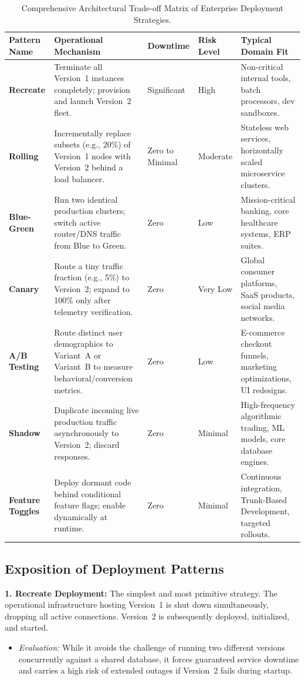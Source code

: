 \documentclass[11pt,a4paper]{article}
\begin{document}
\begin{table}[htbp]
\centering
\scriptsize
\renewcommand{\arraystretch}{1.3}
\begin{tabularx}{\textwidth}{L{2.0cm} Y L{1.5cm} L{1.5cm} L{2.8cm}}
\toprule
{}
\textbf{Pattern Name} & \textbf{Operational Mechanism} & \textbf{Downtime} & \textbf{Risk Level} & \textbf{Typical Domain Fit} \\
\midrule
\textbf{Recreate} & Terminate all Version~1 instances completely; provision and launch Version~2 fleet. & Significant & High & Non-critical internal tools, batch processors, dev sandboxes. \\
\textbf{Rolling} & Incrementally replace subsets (e.g., 20\%) of Version~1 nodes with Version~2 behind a load balancer. & Zero to Minimal & Moderate & Stateless web services, horizontally scaled microservice clusters. \\
\textbf{Blue-Green} & Run two identical production clusters; switch active router/DNS traffic from Blue to Green. & Zero & Low & Mission-critical banking, core healthcare systems, ERP suites. \\
\textbf{Canary} & Route a tiny traffic fraction (e.g., 5\%) to Version~2; expand to 100\% only after telemetry verification. & Zero & Very Low & Global consumer platforms, SaaS products, social media networks. \\
\textbf{A/B Testing} & Route distinct user demographics to Variant~A or Variant~B to measure behavioral/conversion metrics. & Zero & Low & E-commerce checkout funnels, marketing optimizations, UI redesigns. \\
\textbf{Shadow} & Duplicate incoming live production traffic asynchronously to Version~2; discard responses. & Zero & Minimal & High-frequency algorithmic trading, ML models, core database engines. \\
\textbf{Feature Toggles} & Deploy dormant code behind conditional feature flags; enable dynamically at runtime. & Zero & Minimal & Continuous integration, Trunk-Based Development, targeted rollouts. \\
\bottomrule
\end{tabularx}
\caption{Comprehensive Architectural Trade-off Matrix of Enterprise Deployment Strategies.}
\label{tab:deployment_matrix}
\end{table}

\subsection{Exposition of Deployment Patterns}
\textbf{1. Recreate Deployment:} The simplest and most primitive strategy. The operational infrastructure hosting Version~1 is shut down simultaneously, dropping all active connections. Version~2 is subsequently deployed, initialized, and started.
\begin{itemize}
    \item \textit{Evaluation:} While it avoids the challenge of running two different versions concurrently against a shared database, it forces guaranteed service downtime and carries a high risk of extended outages if Version~2 fails during startup.
\end{itemize}
\end{document}
